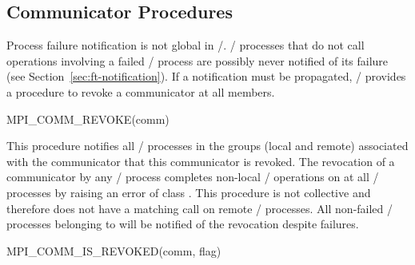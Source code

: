 \subsection{Communicator Procedures}
\label{sec:ft-functions:commfunctions}

\par Process failure notification is not global in \MPI/.
\MPI/ processes that do not call operations involving a failed \MPI/ process are
possibly never notified of its failure (see
Section~\ref{sec:ft-notification}). If a
notification must be propagated, \MPI/
provides a procedure to revoke a communicator at
all members.

\begin{funcdef}{MPI\_COMM\_REVOKE}{(\mbox{comm})}
\end{funcdef}

\par
This procedure notifies all \MPI/ processes in the groups (local and remote)
associated with the communicator  that this communicator
is revoked. The revocation of a communicator by any
\MPI/ process completes non-local \MPI/ operations on
 at all \MPI/ processes by raising an error of class
.
This procedure is not collective and
therefore does not have a matching call on remote \MPI/ processes. All
non-failed \MPI/ processes belonging to  will be notified of the
revocation despite failures.

\begin{funcdef}{MPI\_COMM\_IS\_REVOKED}{(\mbox{comm}, \mbox{flag})}
\end{funcdef}

